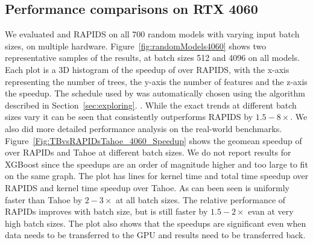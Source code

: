 \subsection{Performance comparisons on RTX 4060}
We evaluated \Treebeard{} and RAPIDS on all 700 random models with varying input batch sizes, on multiple hardware.   
Figure~\ref{fig:randomModels4060} shows two representative samples of the results, at batch sizes 512 and 4096 on all models. 
Each plot is a 3D histogram of the speedup of \Treebeard{} over RAPIDS, with the x-axis representing the number of trees, the y-axis the number of features and the z-axis the speedup. 
The schedule used by \Treebeard{} was automatically chosen using the algorithm described in Section~\ref{sec:exploring}. .
While the exact trends at different batch sizes vary it can be seen that \Treebeard{} consistently outperforms RAPIDS by $1.5-8\times$. 
We also did more detailed performance analysis on the real-world benchmarks.
Figure~\ref{Fig:TBvsRAPIDsTahoe_4060_Speedup} shows the geomean speedup of \Treebeard{} over RAPIDs and Tahoe at different batch sizes. We do not report results for XGBoost since the speedups are an order of magnitude higher and too large to fit on the same graph.
The plot has lines for kernel time and total time speedup over RAPIDS and kernel time speedup over Tahoe. As can been seen \Treebeard{} is uniformly faster than Tahoe by $2-3\times$ at all batch sizes. The relative performance of RAPIDs improves with batch size, but \Treebeard{} is still faster by $1.5-2\times$ evan at very high batch sizes. The plot also shows that the speedups are significant even when data needs to be transferred to the GPU and results need to be transferred back.

